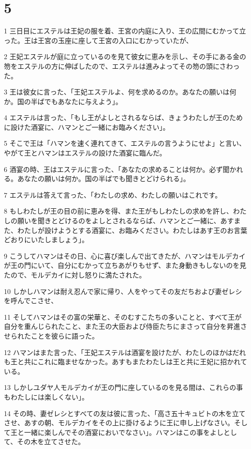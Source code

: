 \chapter{5}

\par 1 三日目にエステルは王妃の服を着、王宮の内庭に入り、王の広間にむかって立った。王は王宮の玉座に座して王宮の入口にむかっていたが、
\par 2 王妃エステルが庭に立っているのを見て彼女に恵みを示し、その手にある金の笏をエステルの方に伸ばしたので、エステルは進みよってその笏の頭にさわった。
\par 3 王は彼女に言った、「王妃エステルよ、何を求めるのか。あなたの願いは何か。国の半ばでもあなたに与えよう」。
\par 4 エステルは言った、「もし王がよしとされるならば、きょうわたしが王のために設けた酒宴に、ハマンとご一緒にお臨みください」。
\par 5 そこで王は「ハマンを速く連れてきて、エステルの言うようにせよ」と言い、やがて王とハマンはエステルの設けた酒宴に臨んだ。
\par 6 酒宴の時、王はエステルに言った、「あなたの求めることは何か。必ず聞かれる。あなたの願いは何か。国の半ばでも聞きとどけられる」。
\par 7 エステルは答えて言った、「わたしの求め、わたしの願いはこれです。
\par 8 もしわたしが王の目の前に恵みを得、また王がもしわたしの求めを許し、わたしの願いを聞きとどけるのをよしとされるならば、ハマンとご一緒に、あすまた、わたしが設けようとする酒宴に、お臨みください。わたしはあす王のお言葉どおりにいたしましょう」。
\par 9 こうしてハマンはその日、心に喜び楽しんで出てきたが、ハマンはモルデカイが王の門にいて、自分にむかって立ちあがりもせず、また身動きもしないのを見たので、モルデカイに対し怒りに満たされた。
\par 10 しかしハマンは耐え忍んで家に帰り、人をやってその友だちおよび妻ゼレシを呼んでこさせ、
\par 11 そしてハマンはその富の栄華と、そのむすこたちの多いことと、すべて王が自分を重んじられたこと、また王の大臣および侍臣たちにまさって自分を昇進させられたことを彼らに語った。
\par 12 ハマンはまた言った、「王妃エステルは酒宴を設けたが、わたしのほかはだれも王と共にこれに臨ませなかった。あすもまたわたしは王と共に王妃に招かれている。
\par 13 しかしユダヤ人モルデカイが王の門に座しているのを見る間は、これらの事もわたしには楽しくない」。
\par 14 その時、妻ゼレシとすべての友は彼に言った、「高さ五十キュビトの木を立てさせ、あすの朝、モルデカイをその上に掛けるように王に申し上げなさい。そして王と一緒に楽しんでその酒宴においでなさい」。ハマンはこの事をよしとして、その木を立てさせた。


